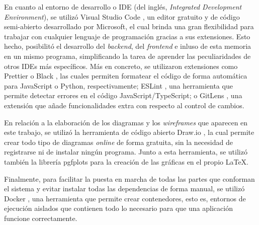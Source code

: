 \bigskip
En cuanto al entorno de desarrollo o IDE (del inglés, \textit{Integrated Development Environment}), se utilizó Visual Studio Code \cite{vscode}, un editor gratuito y de código semi-abierto desarrollado por Microsoft, el cual
brinda una gran flexibilidad para trabajar con cualquier lenguaje de programación gracias a sus extensiones. Esto hecho, posibilitó el desarrollo
del \textit{backend}, del \textit{frontend} e inluso de esta memoria en un mismo programa, simplificando la tarea de aprender las peculiaridades de
otros IDEs más específicos. Más en concreto, se utilizaron extensiones como Prettier \cite{prettier} o Black \cite{blackformatter}, las cuales permiten formatear el código de forma automática para JavaScript o Python, respectivamente;
ESLint \cite{eslint}, una herramienta que permite detectar errores en el código JavaScript/TypeScript; o GitLens \cite{gitlens}, una extensión que añade funcionalidades extra con respecto
al control de cambios.

\bigskip
En relación a la elaboración de los diagramas y los \textit{wireframes} que aparecen en este trabajo, se utilizó la herramienta de código abierto Draw.io \cite{drawio}, la cual permite crear todo tipo de diagramas
\textit{online} de forma gratuita, sin la necesidad de registrarse ni de instalar ningún programa.
Junto a esta herramienta, se utilizó también la librería pgfplots \cite{pgfplots} para la creación de las gráficas en el propio \LaTeX.

\bigskip
Finalmente, para facilitar la puesta en marcha de todas las partes que conforman el sistema y evitar instalar todas las dependencias de forma manual, se utilizó Docker \cite{docker},
una herramienta que permite crear contenedores, esto es, entornos de ejecución aislados que contienen todo lo necesario para que una aplicación funcione correctamente.
